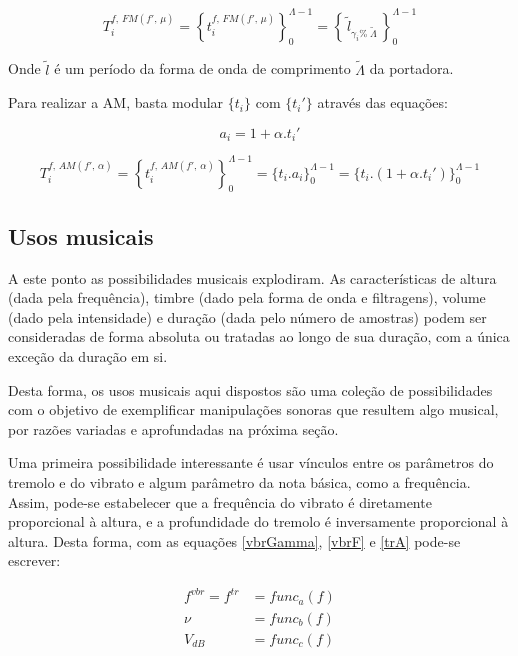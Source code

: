 \begin{equation}\label{fmT}
T_i^{f,\, FM(f',\,\mu)}=\left\{ t_i^{f,\,FM(f',\,\mu)} \right\}_0^{\Lambda-1}=\left\{\,\widetilde{l}_{\gamma_i \%\; \widetilde{\Lambda} } \,\right\}_0^{\Lambda-1}
\end{equation}

Onde $\widetilde{l}$ é um período da forma de onda de comprimento $\widetilde{\Lambda}$ da portadora.

Para realizar a AM, basta modular $\{t_i\}$ com $\{t_i'\}$ através das equações:

\begin{equation}\label{amA}
a_i=1 + \alpha . t_i'
\end{equation}

\begin{equation}\label{amT}
T_i^{f,\,AM(f',\,\alpha)}=\left\{ t_i^{f,\,AM(f',\,\alpha)} \right\}_0^{\Lambda-1}=\{ t_i . a_i \}_0^{\Lambda-1}=\{t_i . (1 + \alpha . t_i')    \}_0^{\Lambda-1}
\end{equation}



\subsection{Usos musicais}\label{subsec:mus2}
A este ponto as possibilidades musicais explodiram. As
características de altura (dada pela frequência),
timbre (dado pela forma de onda e filtragens),
volume (dado pela intensidade) e duração (dada pelo número de amostras)
podem ser consideradas
de forma absoluta ou tratadas ao longo de sua duração,
com a única exceção da duração em si.

Desta forma, os usos musicais aqui dispostos são uma coleção de possibilidades
com o objetivo de exemplificar manipulações sonoras que resultem algo
musical, por razões variadas e aprofundadas na próxima seção.

Uma primeira possibilidade interessante é usar vínculos
entre os parâmetros do tremolo e do vibrato e algum parâmetro da nota básica,
como a frequência. Assim, pode-se estabelecer que
a frequência do vibrato é diretamente proporcional à altura, e a profundidade do tremolo é inversamente proporcional
à altura.
Desta forma, com as equações \ref{vbrGamma}, \ref{vbrF} e \ref{trA}
pode-se escrever:

\begin{equation}\label{eq:vinculos}
\begin{split}
f^{vbr} = f^{tr} & = func_a(f) \\
\nu & = func_b(f) \\
V_{dB} & = func_c(f)
\end{split}
\end{equation}

